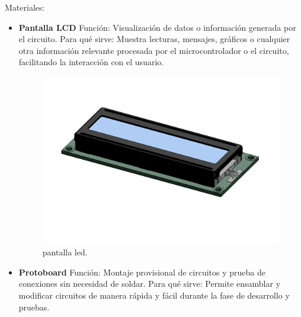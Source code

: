     Materiales:
    \begin{itemize}
    \item \textbf{Pantalla LCD}
    Función: Visualización de datos o información generada por el circuito.
    Para qué sirve: Muestra lecturas, mensajes, gráficos o cualquier otra información relevante procesada por el microcontrolador o el circuito, facilitando la interacción con el usuario.
    \begin{figure}[H]
        \centering
        \includegraphics[scale=0.20]{1/img/Pantalla Led.pdf}
        \caption{pantalla led.}
    \end{figure}
    \item \textbf{Protoboard}
    Función: Montaje provisional de circuitos y prueba de conexiones sin necesidad de soldar.
    Para qué sirve: Permite ensamblar y modificar circuitos de manera rápida y fácil durante la fase de desarrollo y pruebas.
    \begin{figure}[H]
        \centering

\end{figure}
\end{itemize}
